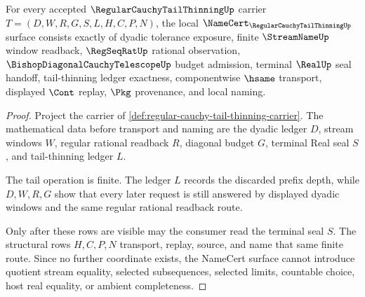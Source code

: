\begin{theorem}
\label{thm:regular-cauchy-tail-thinning-namecert-obligations}
For every accepted $\RegularCauchyTailThinningUp$ carrier $T=(D,W,R,G,S,L,H,C,P,N)$, the local $\NameCert_{\RegularCauchyTailThinningUp}$ surface consists exactly of dyadic tolerance exposure, finite $\StreamNameUp$ window readback, $\RegSeqRatUp$ rational observation, $\BishopDiagonalCauchyTelescopeUp$ budget admission, terminal $\RealUp$ seal handoff, tail-thinning ledger exactness, componentwise $\hsame$ transport, displayed $\Cont$ replay, $\Pkg$ provenance, and local naming.
\end{theorem}
\begin{proof}
Project the carrier of \autoref{def:regular-cauchy-tail-thinning-carrier}. The mathematical data before transport and naming are the dyadic ledger $D$, stream windows $W$, regular rational readback $R$, diagonal budget $G$, terminal Real seal $S$, and tail-thinning ledger $L$.

The tail operation is finite. The ledger $L$ records the discarded prefix depth, while $D,W,R,G$ show that every later request is still answered by displayed dyadic windows and the same regular rational readback route.

Only after these rows are visible may the consumer read the terminal seal $S$. The structural rows $H,C,P,N$ transport, replay, source, and name that same finite route. Since no further coordinate exists, the NameCert surface cannot introduce quotient stream equality, selected subsequences, selected limits, countable choice, host real equality, or ambient completeness.
\end{proof}



